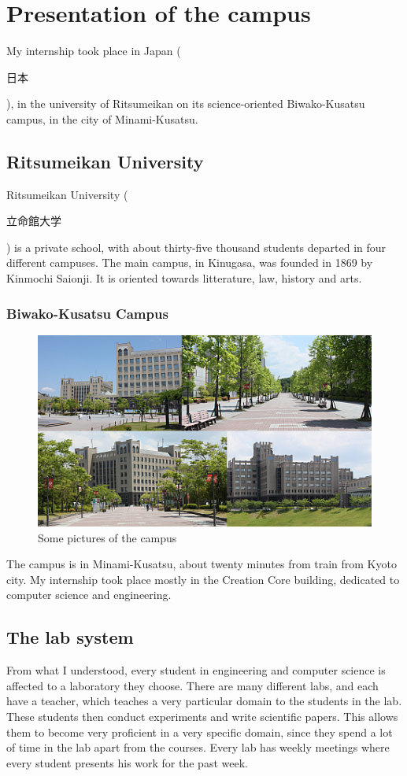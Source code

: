 \section{Presentation of the campus}
My internship took place in Japan (\begin{CJK}{UTF8}{min}日本\end{CJK}), in the university of Ritsumeikan on its science-oriented Biwako-Kusatsu campus, in the city of Minami-Kusatsu.
\subsection{Ritsumeikan University}
Ritsumeikan University (\begin{CJK}{UTF8}{min}立命館大学\end{CJK}) is a private school, with about thirty-five thousand students departed in four different campuses.
The main campus, in Kinugasa, was founded in 1869 by Kinmochi Saionji. It is oriented towards litterature, law, history and arts.
\subsubsection{Biwako-Kusatsu Campus}
\begin{figure}[h]
  \centering
  \includegraphics[scale=0.7]{rits1.jpg}
  \caption{Some pictures of the campus}
\end{figure}
The campus is in Minami-Kusatsu, about twenty minutes from train from Kyoto city. My internship took place mostly in the Creation Core building, dedicated to computer science and engineering.
\subsection{The lab system}
From what I understood, every student in engineering and computer science is affected to a laboratory they choose. There are many different labs, and each have a teacher, which teaches a very particular domain to the students in the lab. These students then conduct experiments and write scientific papers. This allows them to become very proficient in a very specific domain, since they spend a lot of time in the lab apart from the courses. Every lab has weekly meetings where every student presents his work for the past week.
